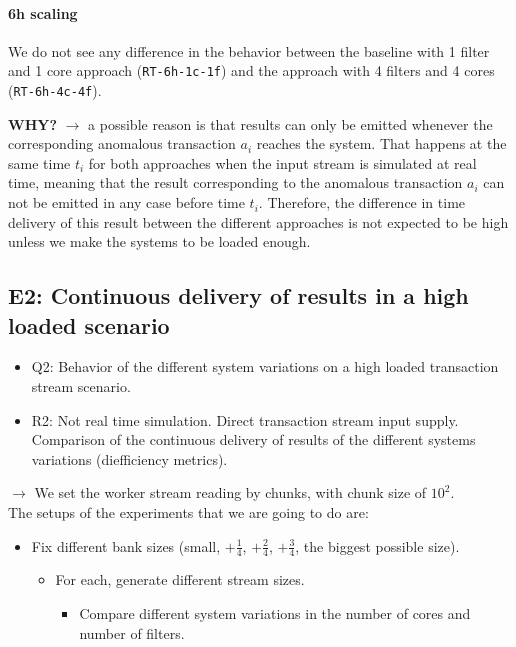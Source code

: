 \paragraph{6h scaling\\}

We do not see any difference in the behavior between the baseline with 1 filter and 1 core approach (\texttt{RT-6h-1c-1f}) and the approach with 4 filters and 4 cores (\texttt{RT-6h-4c-4f}). 

\textbf{WHY?} $\rightarrow$ a possible reason is that results can only be emitted whenever the corresponding anomalous transaction $a_i$ reaches the system. That happens at the same time $t_i$ for both approaches when the input stream is simulated at real time, meaning that the result corresponding to the anomalous transaction $a_i$ can not be emitted in any case before time $t_i$. Therefore, the difference in time delivery of this result between the different approaches is not expected to be high unless we make the systems to be loaded enough.


\subsection{E2: Continuous delivery of results in a high loaded scenario}

\begin{itemize}
  \item Q2: Behavior of the different system variations on a high loaded transaction stream scenario.
  \item R2: Not real time simulation. Direct transaction stream input supply. Comparison of the continuous delivery of results of the different systems variations (diefficiency metrics).
\end{itemize}

$\rightarrow$ We set the worker stream reading by chunks, with chunk size of $10^2$.\\

The setups of the experiments that we are going to do are:
\begin{itemize}
  \item Fix different bank sizes (small, $+\frac{1}{4}$, $+\frac{2}{4}$, $+\frac{3}{4}$, the biggest possible size).
  \begin{itemize}
    \item For each, generate different stream sizes.
    \begin{itemize}
      \item Compare different system variations in the number of cores and number of filters.
    \end{itemize}
  \end{itemize}
\end{itemize}

